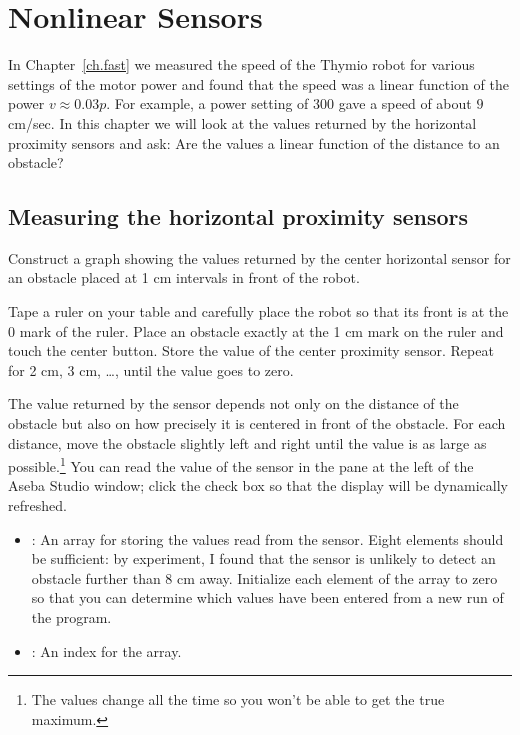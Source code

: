 
\chapter{Nonlinear Sensors}\label{ch.nonlinear}

In Chapter~\ref{ch.fast} we measured the speed of the Thymio robot for
various settings of the motor power and found that the speed was a
linear function of the power $v \approx 0.03p$. For example, a power
setting of $300$ gave a speed of about $9$ cm/sec. In this chapter we
will look at the values returned by the horizontal proximity sensors and
ask: Are the values a linear function of the distance to an obstacle?

\section{Measuring the horizontal proximity sensors}


Construct a graph showing the values returned by the center horizontal
sensor for an obstacle placed at 1 cm intervals in front of
the robot.


Tape a ruler on your table and carefully place the robot so that its
front is at the 0 mark of the ruler. Place an obstacle exactly at the 1
cm mark on the ruler and touch the center button. Store the value of
the center proximity sensor. Repeat for 2 cm, 3 cm, \ldots, until the
value goes to zero.

The value returned by the sensor depends not only on the distance of the
obstacle but also on how precisely it is centered in front of the
obstacle. For each distance, move the obstacle slightly left and right
until the value is as large as possible.\footnote{The values change all
the time so you won't be able to get the true maximum.} You can read the
value of the sensor in the  pane at the left of the Aseba
Studio window; click the check box  so that the display will be
dynamically refreshed.


\begin{itemize}

\item {}: An array for storing the values read from the
sensor. Eight elements should be sufficient: by experiment, I found that
the sensor is unlikely to detect an obstacle further than 8 cm away.
Initialize each element of the array to zero so that you can determine
which values have been entered from a new run of the program.

\item {}: An index for the array. 

\end{itemize}

